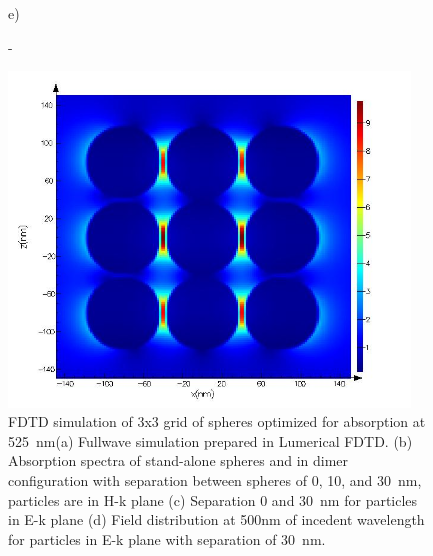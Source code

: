 \documentclass[a4paper]{article}
\begin{document}
\begin{figure}
\begin{minipage}[h]{0.49\textwidth}
  \end{minipage}
  \begin{minipage}[h]{0.49\textwidth}    \begin{flushleft}     e)    \end{flushleft}
  \end{minipage}
  \begin{minipage}[h]{0.49\textwidth}    \begin{flushleft}     -   \end{flushleft}
  \end{minipage}
  \begin{minipage}[h]{0.49\textwidth} 
    \includegraphics[width=0.95\textwidth]{fdtd-field-600nm}
  \end{minipage}
  
    \caption{ FDTD simulation of 3x3 grid of spheres optimized for
      absorption at 525~nm(a) Fullwave simulation prepared in Lumerical FDTD. (b)
     Absorption spectra of stand-alone spheres and in dimer
     configuration with separation between spheres of 0, 10, and
     30~nm, particles are in H-k plane (c) Separation 0 and 30~nm for
     particles in E-k plane (d) Field distribution at 500nm of
     incedent wavelength for particles in E-k plane with separation of
     30~nm.\label{fig:fdtd-3x3}}%
\end{figure}
\end{document}
